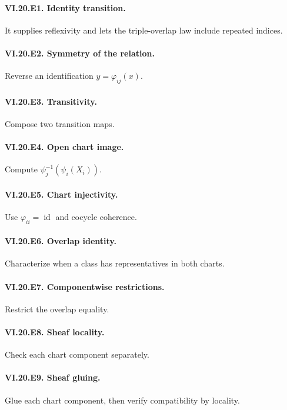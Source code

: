 \paragraph{VI.20.E1. Identity transition.} It supplies reflexivity and lets the triple-overlap law include repeated indices.

\paragraph{VI.20.E2. Symmetry of the relation.} Reverse an identification $y=\varphi_{ij}(x)$.

\paragraph{VI.20.E3. Transitivity.} Compose two transition maps.

\paragraph{VI.20.E4. Open chart image.} Compute $\psi_j^{-1}(\psi_i(X_i))$.

\paragraph{VI.20.E5. Chart injectivity.} Use $\varphi_{ii}=\operatorname{id}$ and cocycle coherence.

\paragraph{VI.20.E6. Overlap identity.} Characterize when a class has representatives in both charts.

\paragraph{VI.20.E7. Componentwise restrictions.} Restrict the overlap equality.

\paragraph{VI.20.E8. Sheaf locality.} Check each chart component separately.

\paragraph{VI.20.E9. Sheaf gluing.} Glue each chart component, then verify compatibility by locality.

